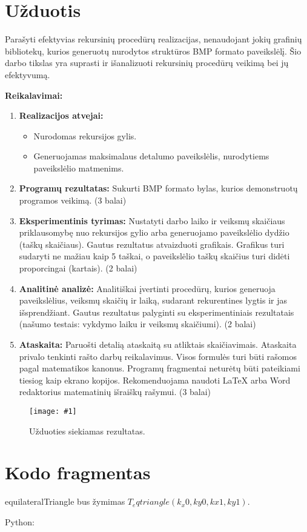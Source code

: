 \documentclass[a4paper,12pt]{article}
\newcommand{\imgc}[4]{
    \begin{figure}[h!]
        \centering
        \texttt{[image: \#1]}
        \caption{#3}  %
        \label{#4}  %
    \end{figure}
}
\newcommand{\code}[2]{
    
}
\begin{document}


\tableofcontents \newpage

\section{Užduotis}
Parašyti efektyvias rekursinių procedūrų realizacijas, nenaudojant jokių grafinių bibliotekų, kurios generuotų nurodytos struktūros BMP formato paveikslėlį. Šio darbo tikslas yra suprasti ir išanalizuoti rekursinių procedūrų veikimą bei jų efektyvumą.

\textbf{Reikalavimai:}
\begin{enumerate}
    \item \textbf{Realizacijos atvejai:}
    \begin{itemize}
        \item Nurodomas rekursijos gylis.
        \item Generuojamas maksimalaus detalumo paveikslėlis, nurodytiems paveikslėlio matmenims.
    \end{itemize}
    \item \textbf{Programų rezultatas:} Sukurti BMP formato bylas, kurios demonstruotų programos veikimą. (3 balai)
    \item \textbf{Eksperimentinis tyrimas:} Nustatyti darbo laiko ir veiksmų skaičiaus priklausomybę nuo rekursijos gylio arba generuojamo paveikslėlio dydžio (taškų skaičiaus). Gautus rezultatus atvaizduoti grafikais. Grafikus turi sudaryti ne mažiau kaip 5 taškai, o paveikslėlio taškų skaičius turi didėti proporcingai (kartais). (2 balai)
    \item \textbf{Analitinė analizė:} Analitiškai įvertinti procedūrų, kurios generuoja paveikslėlius, veiksmų skaičių ir laiką, sudarant rekurentines lygtis ir jas išsprendžiant. Gautus rezultatus palyginti su eksperimentiniais rezultatais (našumo testais: vykdymo laiku ir veiksmų skaičiumi). (2 balai)
    \item \textbf{Ataskaita:} Paruošti detalią ataskaitą su atliktais skaičiavimais. Ataskaita privalo tenkinti rašto darbų reikalavimus. Visos formulės turi būti rašomos pagal matematikos kanonus. Programų fragmentai neturėtų būti pateikiami tiesiog kaip ekrano kopijos. Rekomenduojama naudoti \LaTeX{} arba Word redaktorius matematinių išraiškų rašymui. (3 balai)
\end{enumerate}


\imgc{nuotraukos/Uzduotis.png}{0.8}{Užduoties siekiamas rezultatas.}{}

\section{Kodo fragmentas}

equilateralTriangle bus žymimas $T_eqtriangle(k_x0, ky0, kx1, ky1).$

\code{kodas/example.cs}{csharpstyle}


Python:
\code{kodas/example.py}{pythonstyle}


 
\end{document}
